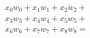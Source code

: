 \documentclass[preview]{standalone}
\begin{document}
\begin{align*}
x_0w_0+x_1w_1+x_2w_2+\\x_3w_3+x_4w_4+x_5w_5+\\x_6w_6+x_7w_7+x_8w_8=
\end{align*}
\end{document}
